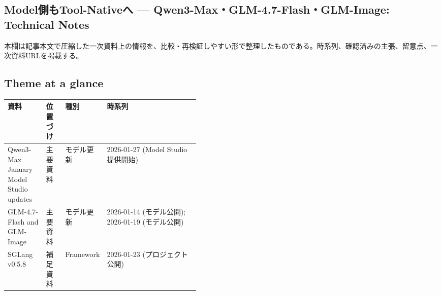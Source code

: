 \subsection*{Model側もTool-Nativeへ — Qwen3-Max・GLM-4.7-Flash・GLM-Image: Technical Notes}
本欄は記事本文で圧縮した一次資料上の情報を、比較・再検証しやすい形で整理したものである。時系列、確認済みの主張、留意点、一次資料URLを掲載する。
\medskip
\subsection*{Theme at a glance}
\begin{center}
\footnotesize
\begin{tabularx}{\linewidth}{@{}p{0.20\linewidth}p{0.10\linewidth}p{0.14\linewidth}X@{}}
\toprule
資料 & 位置づけ & 種別 & 時系列 \\
\midrule
Qwen3-Max January Model Studio updates & 主要資料 & モデル更新 & 2026-01-27 (Model Studio提供開始) \\
GLM-4.7-Flash and GLM-Image & 主要資料 & モデル更新 & 2026-01-14 (モデル公開); 2026-01-19 (モデル公開) \\
SGLang v0.5.8 & 補足資料 & Framework & 2026-01-23 (プロジェクト公開) \\
\bottomrule
\end{tabularx}
\end{center}
\normalsize

